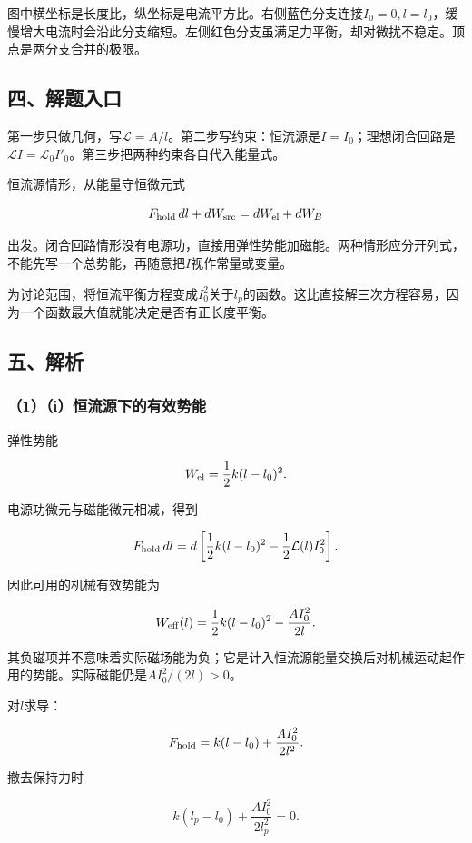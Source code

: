 \documentclass[12pt,a4paper,fontset=fandol]{ctexart}
\begin{document}
图中横坐标是长度比，纵坐标是电流平方比。右侧蓝色分支连接\(I_0=0,l=l_0\)，缓慢增大电流时会沿此分支缩短。左侧红色分支虽满足力平衡，却对微扰不稳定。顶点是两分支合并的极限。

\subsection{四、解题入口}\label{ux56dbux89e3ux9898ux5165ux53e3-1}

第一步只做几何，写\(\mathcal L=A/l\)。第二步写约束：恒流源是\(I=I_0\)；理想闭合回路是\(\mathcal LI=\mathcal L_0I'_0\)。第三步把两种约束各自代入能量式。

恒流源情形，从能量守恒微元式

\[
F_{\rm hold}\,dl+dW_{\rm src}
=dW_{\rm el}+dW_B
\]

出发。闭合回路情形没有电源功，直接用弹性势能加磁能。两种情形应分开列式，不能先写一个总势能，再随意把\(I\)视作常量或变量。

为讨论范围，将恒流平衡方程变成\(I_0^2\)关于\(l_p\)的函数。这比直接解三次方程容易，因为一个函数最大值就能决定是否有正长度平衡。

\subsection{五、解析}\label{ux4e94ux89e3ux6790-1}

\subsubsection{（1）（i）恒流源下的有效势能}\label{iux6052ux6d41ux6e90ux4e0bux7684ux6709ux6548ux52bfux80fd}

弹性势能

\[
W_{\rm el}=\frac12k(l-l_0)^2.
\]

电源功微元与磁能微元相减，得到

\[
F_{\rm hold}\,dl
=d\left[\frac12k(l-l_0)^2
-\frac12\mathcal L(l)I_0^2\right].
\]

因此可用的机械有效势能为

\[
W_{\rm eff}(l)=\frac12k(l-l_0)^2-\frac{AI_0^2}{2l}.
\]

其负磁项并不意味着实际磁场能为负；它是计入恒流源能量交换后对机械运动起作用的势能。实际磁能仍是\(AI_0^2/(2l)>0\)。

对\(l\)求导：

\[
F_{\rm hold}=k(l-l_0)+\frac{AI_0^2}{2l^2}.
\]

撤去保持力时

\[
\boxed{k(l_p-l_0)+\frac{AI_0^2}{2l_p^2}=0}.
\]
\end{document}
